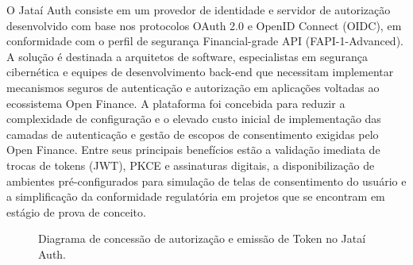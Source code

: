 \documentclass[
  12pt,
  openright,
  oneside,
  a4paper,
  brazilian
]{abntex2}
\begin{document}
O Jataí Auth consiste em um provedor de identidade e servidor de autorização desenvolvido com base nos protocolos OAuth 2.0 e OpenID Connect (OIDC), em conformidade com o perfil de segurança Financial-grade API (FAPI-1-Advanced). A solução é destinada a arquitetos de software, especialistas em segurança cibernética e equipes de desenvolvimento back-end que necessitam implementar mecanismos seguros de autenticação e autorização em aplicações voltadas ao ecossistema Open Finance. A plataforma foi concebida para reduzir a complexidade de configuração e o elevado custo inicial de implementação das camadas de autenticação e gestão de escopos de consentimento exigidas pelo Open Finance. Entre seus principais benefícios estão a validação imediata de trocas de tokens (JWT), PKCE e assinaturas digitais, a disponibilização de ambientes pré-configurados para simulação de telas de consentimento do usuário e a simplificação da conformidade regulatória em projetos que se encontram em estágio de prova de conceito.

\begin{figure}[htbp]
\centering
{}
\caption{Diagrama de concessão de autorização e emissão de Token no Jataí Auth.}
\label{fig:jatai_auth}
\end{figure}
\end{document}
